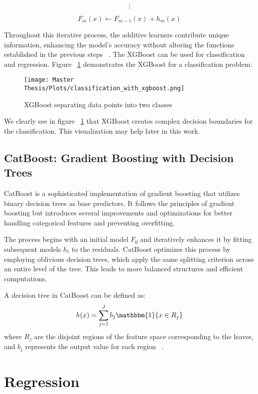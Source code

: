 \[
\vdots
\]

\[
F_m(x) \leftarrow F_{m-1}(x) + h_m(x)
\]

Throughout this iterative process, the additive learners contribute unique information, enhancing the model's accuracy without altering the functions established in the previous steps ~\cite{analyticsvidhyaIntroductionXGBoost}.
The XGBoost can be used for classification and regression. Figure ~\ref{fig:XGBoost} demonstrates the XGBoost for a classification problem:

\FloatBarrier
\begin{figure}[h!]
  \centering
    \centering
    \texttt{[image: Master Thesis/Plots/classification\_with\_xgboost.png]}
    \caption{XGBoost separating data points into two classes}
    \label{fig:XGBoost}
\end{figure}
\FloatBarrier
We clearly see in figure ~\ref{fig:XGBoost} that XGBoost creates complex decision boundaries for the classification.
This visualization may help later in this work.

\subsection{CatBoost: Gradient Boosting with Decision Trees}
CatBoost is a sophisticated implementation of gradient boosting that utilizes binary decision trees as base predictors. It follows the principles of gradient boosting but introduces several improvements and optimizations for better handling categorical features and preventing overfitting.

The process begins with an initial model \( F_0 \) and iteratively enhances it by fitting subsequent models \( h_t \) to the residuals. CatBoost optimizes this process by employing oblivious decision trees, which apply the same splitting criterion across an entire level of the tree. This leads to more balanced structures and efficient computations.

A decision tree in CatBoost can be defined as:
\begin{equation}
h(x) = \sum_{j=1}^J b_j \mathbbm{1}\{x \in R_j\}
\end{equation}
where \( R_j \) are the disjoint regions of the feature space corresponding to the leaves, and \( b_j \) represents the output value for each region ~\cite{prokhorenkova2019catboost}.

\section{Regression}

